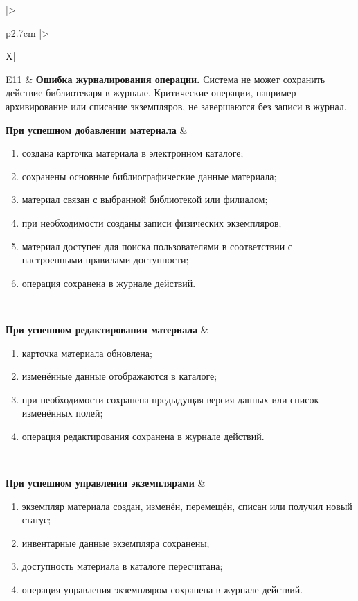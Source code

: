 \documentclass[12pt,a4paper]{article}
\begin{document}
\begin{xltabular}{\textwidth}{
				|>{\raggedright\arraybackslash}p{2.7cm}
				|>{\raggedright\arraybackslash}X|
			}
			E11 &
			\textbf{Ошибка журналирования операции.}
			Система не может сохранить действие библиотекаря в журнале. Критические
			операции, например архивирование или списание экземпляров, не
			завершаются без записи в журнал. \\
			\hline
			
			
			\textbf{При успешном добавлении материала} &
			\begin{enumerate}
				\item создана карточка материала в электронном каталоге;
				\item сохранены основные библиографические данные материала;
				\item материал связан с выбранной библиотекой или филиалом;
				\item при необходимости созданы записи физических экземпляров;
				\item материал доступен для поиска пользователями в соответствии с
				настроенными правилами доступности;
				\item операция сохранена в журнале действий.
			\end{enumerate} \\
			\hline
			
			\textbf{При успешном редактировании материала} &
			\begin{enumerate}
				\item карточка материала обновлена;
				\item изменённые данные отображаются в каталоге;
				\item при необходимости сохранена предыдущая версия данных или список
				изменённых полей;
				\item операция редактирования сохранена в журнале действий.
			\end{enumerate} \\
			\hline
			
			\textbf{При успешном управлении экземплярами} &
			\begin{enumerate}
				\item экземпляр материала создан, изменён, перемещён, списан или получил
				новый статус;
				\item инвентарные данные экземпляра сохранены;
				\item доступность материала в каталоге пересчитана;
				\item операция управления экземпляром сохранена в журнале действий.
			\end{enumerate} \\
			\hline
			

\end{xltabular}
\end{document}
